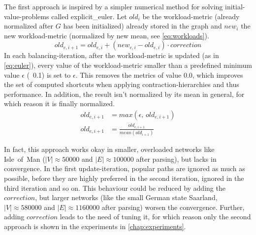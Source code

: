         The first approach is inspired by a simpler numerical method for solving initial-value-problems called \gls{explicit_euler}.
        Let $\mathit{old}_i$ be the workload-\gls{metric} (already normalized after $G$ has been initialized) already stored in the graph and $\mathit{new}_i$ the new workload-\gls{metric} (normalized by new mean, see \vref{eq:workloads}).
        \begin{equation}
        \label{eq:euler}
            \mathit{old}_{e,i+1} = \mathit{old}_{e,i} + (\mathit{new}_{e,i} - \mathit{old}_{e,i}) \cdot \mathit{correction}
        \end{equation}
        In each \gls{balancing}-iteration, after the workload-\gls{metric} is updated (as in \vref{eq:euler}), every value of the workload-\gls{metric} smaller than a predefined minimum value $\epsilon$ (\eg\ \num{0.1}) is set to $\epsilon$.
        This removes the \glspl{metric} of value \num{0.0}, which improves the set of computed shortcuts when applying \gls{contraction-hierarchies} and thus performance.
        In addition, the result isn't normalized by its mean in general, for which reason it is finally normalized.
        \begin{equation}
        \label{eq:metric_cleanup}
        \begin{aligned}
            \mathit{old}_{e,i+1} &= \mathit{max} \left( \epsilon \text{,\ } \mathit{old}_{e,i+1} \right)\\
            \mathit{old}_{e,i+1} &= \frac{\mathit{old}_{e,i+1}}{\mathit{mean}(\mathit{old}_{i+1})}
        \end{aligned}
        \end{equation}

        In fact, this approach works okay in smaller, overloaded networks like Isle~of~Man ($|V| \approx \num{50000}$ and $|E| \approx \num{100000}$ after parsing), but lacks in convergence.
        In the first update-iteration, popular paths are ignored as much as possible, before they are highly preferred in the second iteration, ignored in the third iteration and so on.
        This behaviour could be reduced by adding the $\mathit{correction}$, but larger networks (like the small German state Saarland, $|V| \approx \num{580000}$ and $|E| \approx \num{1160000}$ after parsing) worsen the convergence.
        Further, adding $\mathit{correction}$ leads to the need of tuning it, for which reason only the second approach is shown in the experiments in \vref{chap:experiments}.

